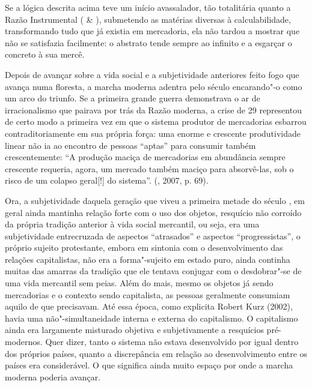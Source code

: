 {Se a lógica descrita acima teve um início avassalador, tão totalitária
quanto a Razão Instrumental ( \& ), submetendo as
matérias diversas à calculabilidade, transformando
tudo que já existia em mercadoria, ela não tardou a mostrar que não se
satisfazia facilmente: o abstrato tende sempre ao infinito e a esgarçar
o concreto à sua mercê.

Depois de avançar sobre a vida social e a subjetividade anteriores feito
fogo que avança numa floresta, a marcha moderna adentra pelo século 
encarando"-o como um arco do triunfo. Se a primeira grande guerra
demonstrava o ar de irracionalismo que pairava por trás da Razão
moderna, a crise de 29 representou de certo modo a primeira vez em que o
sistema produtor de mercadorias esbarrou contraditoriamente em sua
própria força: uma enorme e crescente produtividade linear não ia ao
encontro de pessoas ``aptas'' para consumir também crescentemente: ``A
produção maciça de mercadorias em abundância sempre crescente requeria,
agora, um mercado também maciço para absorvê-las, sob o risco de um
colapso geral[!] do sistema''. (, 2007, p. 69).

Ora, a subjetividade daquela geração que viveu a primeira metade do
século , em geral ainda mantinha relação forte com o uso dos objetos,
resquício não corroído da própria tradição anterior à vida social
mercantil, ou seja, era uma subjetividade entrecruzada de aspectos
``atrasados'' e aspectos ``progressistas'', o próprio sujeito
protestante, embora em sintonia com o desenvolvimento das relações
capitalistas, não era a forma"-sujeito em estado puro, ainda continha
muitas das amarras da tradição que ele tentava conjugar com o
desdobrar"-se de uma vida mercantil sem peias. Além do mais, mesmo os
objetos já sendo mercadorias e o contexto sendo capitalista, as pessoas
geralmente consumiam aquilo de que precisavam. Até essa época, como
explicita Robert Kurz (2002), havia uma não"-simultaneidade interna e
externa do capitalismo. O capitalismo ainda era largamente misturado
objetiva e subjetivamente a resquícios pré-modernos. Quer dizer, tanto o
sistema não estava desenvolvido por igual dentro dos próprios países,
quanto a discrepância em relação ao desenvolvimento entre os países era
considerável. O que significa ainda muito espaço por onde a marcha
moderna poderia avançar.

}
